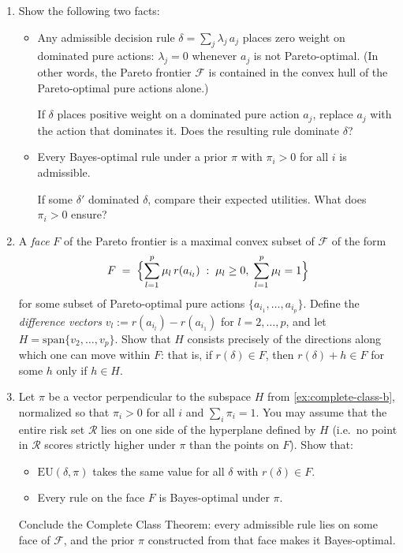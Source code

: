 \documentclass[11pt]{article}
\begin{document}
\begin{exercise}
\begin{enumerate}
\item \label{ex:complete-class-a} Show the following two facts:
\begin{itemize}
  \item[(i)] Any admissible decision rule $\delta = \sum_j \lambda_j\, a_j$ places
    zero weight on dominated pure actions: $\lambda_j = 0$ whenever $a_j$ is not
    Pareto-optimal. (In other words, the Pareto frontier $\mathcal{F}$ is contained
    in the convex hull of the Pareto-optimal pure actions alone.)
    \begin{hint}
    If $\delta$ places positive weight on a dominated pure action $a_j$,
    replace $a_j$ with the action that dominates it. Does the resulting rule dominate
    $\delta$?
    \end{hint}
  \item[(ii)] Every Bayes-optimal rule under a prior $\pi$ with $\pi_i > 0$ for all
    $i$ is admissible.
    \begin{hint}
    If some $\delta'$ dominated $\delta$, compare their expected
    utilities. What does $\pi_i > 0$ ensure?
    \end{hint}
\end{itemize}

\item \label{ex:complete-class-b} A \emph{face} $F$ of the Pareto frontier is a maximal convex
subset of $\mathcal{F}$ of the form
\[
  F \;=\; \Bigl\{\sum_{l=1}^p \mu_l\, r(a_{i_l}) \;:\;
  \mu_l \geq 0,\; \sum_{l=1}^p \mu_l = 1\Bigr\}
\]
for some subset of Pareto-optimal pure actions $\{a_{i_1}, \ldots, a_{i_p}\}$. Define
the \emph{difference vectors} $v_l := r(a_{i_l}) - r(a_{i_1})$ for
$l = 2, \ldots, p$, and let $H = \mathrm{span}\{v_2, \ldots, v_p\}$. Show that $H$
consists precisely of the directions along which one can move within $F$: that is, if
$r(\delta) \in F$, then $r(\delta) + h \in F$ for some $h$ only if $h \in H$.

\item \label{ex:complete-class-c} Let $\pi$ be a vector perpendicular to the subspace $H$ from
\cref{ex:complete-class-b}, normalized so that $\pi_i > 0$ for all $i$ and $\sum_i \pi_i = 1$. You may
assume that the entire risk set $\mathcal{R}$ lies on one side of the hyperplane
defined by $H$ (i.e.\ no point in $\mathcal{R}$ scores strictly higher under $\pi$
than the points on $F$). Show that:
\begin{itemize}
  \item[(i)] $\mathrm{EU}(\delta, \pi)$ takes the same value for all $\delta$ with
    $r(\delta) \in F$.
  \item[(ii)] Every rule on the face $F$ is Bayes-optimal under $\pi$.
\end{itemize}
Conclude the Complete Class Theorem: every admissible rule lies on some face of
$\mathcal{F}$, and the prior $\pi$ constructed from that face makes it Bayes-optimal.
\end{enumerate}
\end{exercise}
\end{document}

